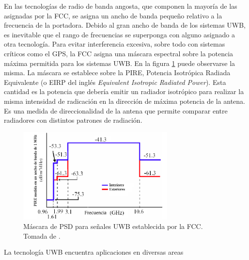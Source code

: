 En las tecnologías de radio de banda angosta, que componen la mayoría de las
asignadas por la FCC, se asigna un ancho de banda pequeño relativo a la
frecuencia de la portadora. Debido al gran ancho de banda de los sistemas UWB,
es inevitable que el rango de frecuencias se superponga con alguno asignado a
otra tecnología. Para evitar interferencia excesiva, sobre todo con sistemas
críticos como el GPS, la FCC asigna una máscara espectral sobre la potencia
máxima permitida para los sistemas UWB. En la figura \ref{fig:fcc_uwb_psd_mask}
puede observarse la misma.  La máscara se establece sobre la PIRE, Potencia
Isotrópica Radiada Equivalente (o EIRP del inglés \textit{Equivalent Isotropic
Radiated Power}). Esta cantidad es la potencia que debería emitir un radiador
isotrópico para realizar la misma intensidad de radicación en la dirección de
máxima potencia de la antena. Es una medida de direccionalidad de la antena que
permite comparar entre radiadores con distintos patrones de radiación.

\begin{figure}[t]
    \centering
    \includegraphics[width=0.7\textwidth]{images/fcc_uwb_psd_mask.png}
    \caption{Máscara de PSD para señales UWB establecida por la FCC. Tomada de \cite{Heydari2005}.}
    \label{fig:fcc_uwb_psd_mask}
\end{figure}

La tecnología UWB encuentra aplicaciones en diversas areas

